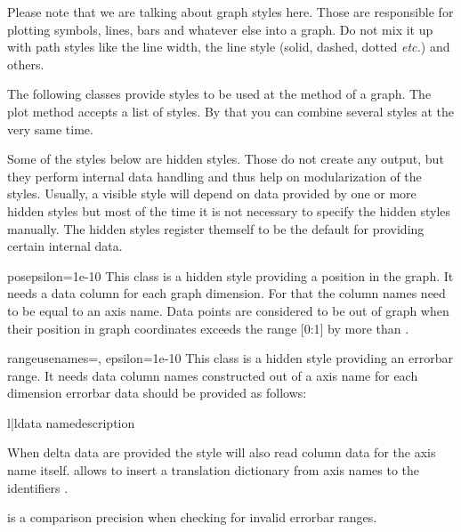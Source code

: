 Please note that we are talking about graph styles here. Those are
responsible for plotting symbols, lines, bars and whatever else into a
graph. Do not mix it up with path styles like the line width, the line
style (solid, dashed, dotted \emph{etc.}) and others.

The following classes provide styles to be used at the 
method of a graph. The plot method accepts a list of styles. By that
you can combine several styles at the very same time.

Some of the styles below are hidden styles. Those do not create any
output, but they perform internal data handling and thus help on
modularization of the styles. Usually, a visible style will depend on
data provided by one or more hidden styles but most of the time it is
not necessary to specify the hidden styles manually. The hidden styles
register themself to be the default for providing certain internal
data.

\begin{classdesc}{pos}{epsilon=1e-10} %
  This class is a hidden style providing a position in the graph. It
  needs a data column for each graph dimension. For that the column
  names need to be equal to an axis name. Data points are considered
  to be out of graph when their position in graph coordinates exceeds
  the range [0:1] by more than .
\end{classdesc} %

\begin{classdesc}{range}{usenames={}, epsilon=1e-10} %
  This class is a hidden style providing an errorbar range. It needs
  data column names constructed out of a axis name  for each
  dimension errorbar data should be provided as follows:
  \begin{tableii}{l|l}{}{data name}{description}
  \end{tableii}
  When delta data are provided the style will also read column data
  for the axis name  itself.  allows to insert a
  translation dictionary from axis names to the identifiers .

   is a comparison precision when checking for invalid
  errorbar ranges.
\end{classdesc} %

